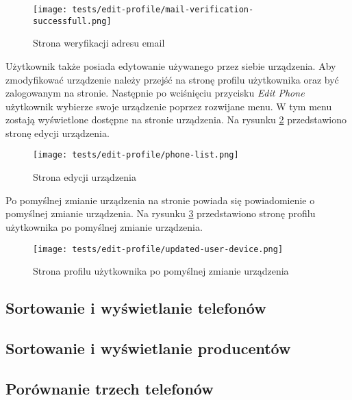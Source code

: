 \begin{figure}[H]
  \centering
  \texttt{[image: tests/edit-profile/mail-verification-successfull.png]}
  \caption{Strona weryfikacji adresu email}
  \label{verify_email_page}
\end{figure}
Użytkownik także posiada edytowanie używanego przez siebie urządzenia. Aby zmodyfikować urządzenie należy przejść na stronę profilu użytkownika oraz być zalogowanym na stronie. Następnie po wciśnięciu przycisku \textit{Edit Phone} użytkownik wybierze swoje urządzenie poprzez rozwijane menu. W tym menu zostają wyświetlone dostępne na stronie urządzenia. Na rysunku \ref{edit_phone} przedstawiono stronę edycji urządzenia.
\begin{figure}[H]
  \centering
  \texttt{[image: tests/edit-profile/phone-list.png]}
  \caption{Strona edycji urządzenia}
  \label{edit_phone}
\end{figure}
Po pomyślnej zmianie urządzenia na stronie powiada się powiadomienie o pomyślnej zmianie urządzenia. Na rysunku \ref{edit_phone_success} przedstawiono stronę profilu użytkownika po pomyślnej zmianie urządzenia.
\begin{figure}[H]
  \centering
  \texttt{[image: tests/edit-profile/updated-user-device.png]}
  \caption{Strona profilu użytkownika po pomyślnej zmianie urządzenia}
  \label{edit_phone_success}
\end{figure}

\subsection{Sortowanie i wyświetlanie telefonów}

\subsection{Sortowanie i wyświetlanie producentów}

\subsection{Porównanie trzech telefonów}
